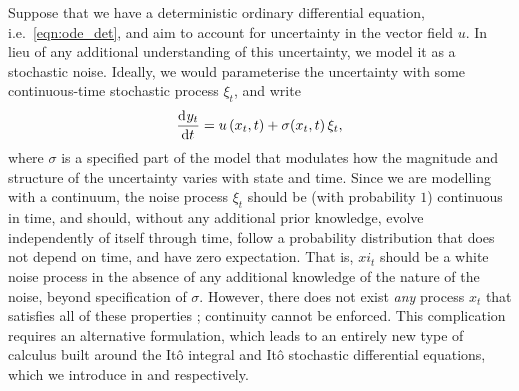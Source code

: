 Suppose that we have a deterministic ordinary differential equation, i.e.\ \cref{eqn:ode_det}, and aim to account for uncertainty in the vector field \(u\).
In lieu of any additional understanding of this uncertainty, we model it as a stochastic noise.
Ideally, we would parameterise the uncertainty with some continuous-time stochastic process \(\xi_t\), and write
\begin{equation}\label{eqn:fake_sde}
	\dod{y_t}{t} = u\left(x_t, t\right) + \sigma\!\left(x_t, t\right)\xi_t,
\end{equation}
where \(\sigma\) is a specified part of the model that modulates how the magnitude and structure of the uncertainty varies with state and time.
Since we are modelling with a continuum, the noise process \(\xi_t\) should be (with probability \(1\)) continuous in time, and should, without any additional prior knowledge, evolve independently of itself through time, follow a probability distribution that does not depend on time, and have zero expectation.
That is, \(xi_t\) should be a white noise process in the absence of any additional knowledge of the nature of the noise, beyond specification of \(\sigma\).
However, there does not exist \emph{any} process \(x_t\) that satisfies all of these properties \citep{Oksendal_2003_StochasticDifferentialEquations}; continuity cannot be enforced.
This complication requires an alternative formulation, which leads to an entirely new type of calculus built around the It\^o integral and It\^o stochastic differential equations, which we introduce in  and  respectively.


